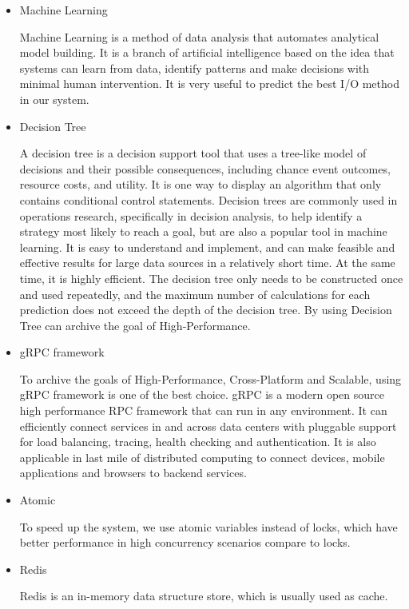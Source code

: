 \documentclass[conference]{IEEEtran}
\begin{document}
\begin{itemize}
    \item Machine Learning

     Machine Learning is a method of data analysis that automates analytical model building. 
     It is a branch of artificial intelligence based on the idea that systems can learn from data, identify patterns and make decisions with minimal human intervention.
     It is very useful to predict the best I/O method in our system.

    \item Decision Tree 

    A decision tree is a decision support tool that uses a tree-like model of decisions and their possible consequences, including chance event outcomes, resource costs, and utility. It is one way to display an algorithm that only contains conditional control statements.
    Decision trees are commonly used in operations research, specifically in decision analysis, to help identify a strategy most likely to reach a goal, but are also a popular tool in machine learning.
    It is easy to understand and implement, and can make feasible and effective results for large data sources in a relatively short time. At the same time, it is highly efficient. The decision tree only needs to be constructed once and used repeatedly,
    and the maximum number of calculations for each prediction does not exceed the depth of the decision tree. By using Decision Tree can archive the goal of High-Performance.

    \item gRPC framework

    To archive the goals of High-Performance, Cross-Platform and Scalable, using gRPC framework is one of the best choice.
    gRPC is a modern open source high performance RPC framework that can run in any environment. It can efficiently connect services in and across data centers with pluggable support for load balancing, tracing, health checking and authentication. It is also applicable in last mile of distributed computing to connect devices, mobile applications and browsers to backend services.

    \item Atomic

    To speed up the system, we use atomic variables instead of locks, which have better performance in high concurrency scenarios compare to locks.
    \item Redis 

    Redis is an in-memory data structure store, which is usually used as cache.
\end{itemize}
\end{document}
